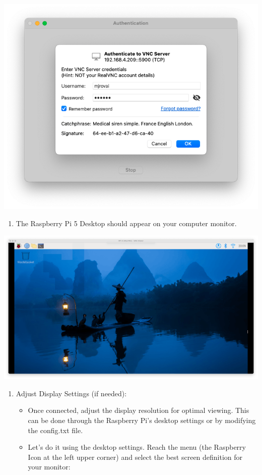 \documentclass[
]{article}
\providecommand{\tightlist}{%
  \setlength{\itemsep}{0pt}\setlength{\parskip}{0pt}}\usepackage{longtable,booktabs,array}
\begin{document}
\noindent \begin{center}
\includegraphics[width=0.8\linewidth,height=\textheight,keepaspectratio]{images/png/vnc-7.png}
\end{center}

\begin{enumerate}
\def\labelenumi{\arabic{enumi}.}
\setcounter{enumi}{4}
\tightlist
\item
  The Raspberry Pi 5 Desktop should appear on your computer monitor.
\end{enumerate}

\noindent \begin{center}
\includegraphics[width=0.85\linewidth,height=\textheight,keepaspectratio]{images/png/vnc-8.png}
\end{center}

\begin{enumerate}
\def\labelenumi{\arabic{enumi}.}
\setcounter{enumi}{5}
\item
  Adjust Display Settings (if needed):

  \begin{itemize}
  \tightlist
  \item
    Once connected, adjust the display resolution for optimal viewing.
    This can be done through the Raspberry Pi's desktop settings or by
    modifying the config.txt file.
  \item
    Let's do it using the desktop settings. Reach the menu (the
    Raspberry Icon at the left upper corner) and select the best screen
    definition for your monitor:
  \end{itemize}
\end{enumerate}
\end{document}
